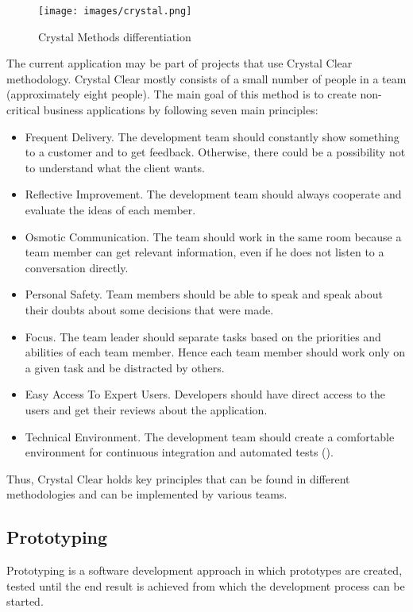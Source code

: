 \documentclass[a4paper]{article}
\begin{document}
    \begin{figure}[H]
     \texttt{[image: images/crystal.png]}
     \centering
     \caption{Crystal Methods differentiation}
     \label{crystalMethods}
    \end{figure}
    
    The current application may be part of projects that use Crystal Clear methodology. Crystal Clear mostly consists of a small number of people in a team (approximately eight people). The main goal of this method is to create non-critical business applications by following seven main principles: 
    \begin{itemize}
        \item Frequent Delivery. The development team should constantly show something to a customer and to get feedback. Otherwise, there could be a possibility not to understand what the client wants.
        \item Reflective Improvement. The development team should always cooperate and evaluate the ideas of each member.
        \item Osmotic Communication. The team should work in the same room because a team member can get relevant information, even if he does not listen to a conversation directly.
        \item Personal Safety. Team members should be able to speak and speak about their doubts about some decisions that were made.
        \item Focus. The team leader should separate tasks based on the priorities and abilities of each team member. Hence each team member should work only on a given task and be distracted by others.
        \item Easy Access To Expert Users. Developers should have direct access to the users and get their reviews about the application.
        \item Technical Environment. The development team should create a comfortable environment for continuous integration and automated tests  (\cite{crystalclear}).
    \end{itemize}
    
    Thus, Crystal Clear holds key principles that can be found in different methodologies and can be implemented by various teams. 
    
    \subsection{Prototyping}
    Prototyping is a software development approach in which prototypes are created, tested until the end result is achieved from which the development process can be started. 
    
\end{document}
